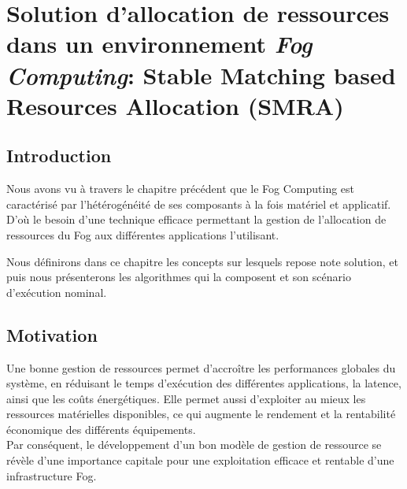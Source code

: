 \chapter{Solution d'allocation de ressources dans un environnement \emph{Fog Computing}: Stable Matching based Resources Allocation (SMRA)}
\thispagestyle{fancy}
\section{Introduction}
Nous avons vu à travers le chapitre précédent que le Fog Computing est caractérisé par l'hétérogénéité de ses composants à la fois matériel et applicatif. D'où le besoin d'une technique efficace permettant la gestion de l'allocation de ressources du Fog aux différentes applications l'utilisant.\par
Nous définirons dans ce chapitre les concepts sur lesquels repose note solution, et puis nous présenterons les algorithmes qui la composent et son scénario d'exécution nominal.

\section{Motivation}
Une bonne gestion de ressources permet d'accroître les performances globales du système, en réduisant le temps d'exécution des différentes applications, la latence, ainsi que les coûts énergétiques. Elle permet aussi d'exploiter au mieux les ressources matérielles disponibles, ce qui augmente le rendement et la rentabilité économique des différents équipements.\\ 
Par conséquent, le développement d'un bon modèle de gestion de ressource se révèle d'une importance capitale pour une exploitation efficace et rentable d'une infrastructure Fog.


